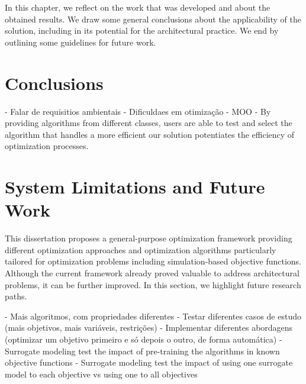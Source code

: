 \label{chap:conclusion}

In this chapter, we reflect on the work that was developed and about the obtained results. We draw some general conclusions about the applicability of the solution, including in its potential for the architectural practice. We end by outlining some guidelines for future work. 

\section{Conclusions}

- Falar de requisitios ambientais
- Dificuldaes em otimização 
- MOO
- 
By providing algorithms from different classes, users are able to test and select the algorithm that handles a more efficient 
our solution potentiates the efficiency of optimization processes. 



\section{System Limitations and Future Work}

This dissertation proposes a general-purpose optimization framework providing different optimization approaches and optimization algorithms particularly tailored for optimization problems including simulation-based objective functions. Although the current framework already proved valuable to address architectural problems, it can be further improved. In this section, we highlight future research paths.


- Mais algoritmos, com propriedades diferentes
- Testar diferentes casos de estudo (mais objetivos, mais variáveis, restrições)
- Implementar diferentes abordagens (optimizar um objetivo primeiro e só depois o outro, de forma automática)
- Surrogate modeling test the impact of pre-training the algorithms in known objective functions
- Surrogate modeling test the impact of using one surrogate model to each objective vs using one to all objectives


